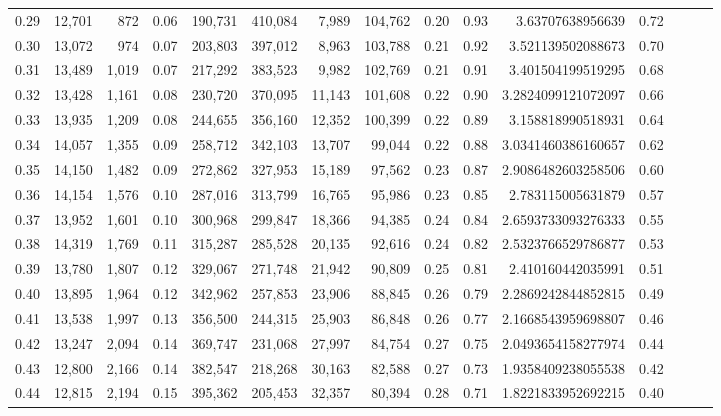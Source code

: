 \begin{tabular}{rrrrrrrrrrrrrrr}
0.29 &  12,701 &    872 &  0.06 &  190,731 &  410,084 &    7,989 &  104,762 &  0.20 &  0.93 &      3.63707638956639 &      0.72 \\
0.30 &  13,072 &    974 &  0.07 &  203,803 &  397,012 &    8,963 &  103,788 &  0.21 &  0.92 &     3.521139502088673 &      0.70 \\
0.31 &  13,489 &  1,019 &  0.07 &  217,292 &  383,523 &    9,982 &  102,769 &  0.21 &  0.91 &     3.401504199519295 &      0.68 \\
0.32 &  13,428 &  1,161 &  0.08 &  230,720 &  370,095 &   11,143 &  101,608 &  0.22 &  0.90 &    3.2824099121072097 &      0.66 \\
0.33 &  13,935 &  1,209 &  0.08 &  244,655 &  356,160 &   12,352 &  100,399 &  0.22 &  0.89 &     3.158818990518931 &      0.64 \\
0.34 &  14,057 &  1,355 &  0.09 &  258,712 &  342,103 &   13,707 &   99,044 &  0.22 &  0.88 &    3.0341460386160657 &      0.62 \\
0.35 &  14,150 &  1,482 &  0.09 &  272,862 &  327,953 &   15,189 &   97,562 &  0.23 &  0.87 &    2.9086482603258506 &      0.60 \\
0.36 &  14,154 &  1,576 &  0.10 &  287,016 &  313,799 &   16,765 &   95,986 &  0.23 &  0.85 &     2.783115005631879 &      0.57 \\
0.37 &  13,952 &  1,601 &  0.10 &  300,968 &  299,847 &   18,366 &   94,385 &  0.24 &  0.84 &    2.6593733093276333 &      0.55 \\
0.38 &  14,319 &  1,769 &  0.11 &  315,287 &  285,528 &   20,135 &   92,616 &  0.24 &  0.82 &    2.5323766529786877 &      0.53 \\
0.39 &  13,780 &  1,807 &  0.12 &  329,067 &  271,748 &   21,942 &   90,809 &  0.25 &  0.81 &     2.410160442035991 &      0.51 \\
0.40 &  13,895 &  1,964 &  0.12 &  342,962 &  257,853 &   23,906 &   88,845 &  0.26 &  0.79 &    2.2869242844852815 &      0.49 \\
0.41 &  13,538 &  1,997 &  0.13 &  356,500 &  244,315 &   25,903 &   86,848 &  0.26 &  0.77 &    2.1668543959698807 &      0.46 \\
0.42 &  13,247 &  2,094 &  0.14 &  369,747 &  231,068 &   27,997 &   84,754 &  0.27 &  0.75 &    2.0493654158277974 &      0.44 \\
0.43 &  12,800 &  2,166 &  0.14 &  382,547 &  218,268 &   30,163 &   82,588 &  0.27 &  0.73 &    1.9358409238055538 &      0.42 \\
0.44 &  12,815 &  2,194 &  0.15 &  395,362 &  205,453 &   32,357 &   80,394 &  0.28 &  0.71 &    1.8221833952692215 &      0.40 \\

\end{tabular}
